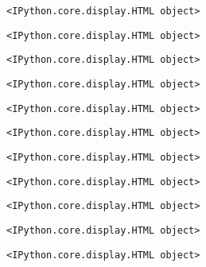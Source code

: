 \documentclass[11pt]{article}
\begin{document}
    
    
    \begin{verbatim}
<IPython.core.display.HTML object>
    \end{verbatim}

    
    
    \begin{verbatim}
<IPython.core.display.HTML object>
    \end{verbatim}

    
    
    \begin{verbatim}
<IPython.core.display.HTML object>
    \end{verbatim}

    
    
    \begin{verbatim}
<IPython.core.display.HTML object>
    \end{verbatim}

    
    
    \begin{verbatim}
<IPython.core.display.HTML object>
    \end{verbatim}

    
    
    \begin{verbatim}
<IPython.core.display.HTML object>
    \end{verbatim}

    
    
    \begin{verbatim}
<IPython.core.display.HTML object>
    \end{verbatim}

    
    
    \begin{verbatim}
<IPython.core.display.HTML object>
    \end{verbatim}

    
    
    \begin{verbatim}
<IPython.core.display.HTML object>
    \end{verbatim}

    
    
    \begin{verbatim}
<IPython.core.display.HTML object>
    \end{verbatim}

    
    
    \begin{verbatim}
<IPython.core.display.HTML object>
    \end{verbatim}
\end{document}
